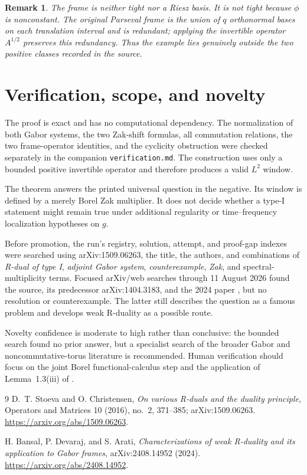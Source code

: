 \documentclass[11pt]{article}
\newtheorem{remark}{Remark}
\begin{document}
\begin{remark}
The frame is neither tight nor a Riesz basis.  It is not tight because
$\phi$ is nonconstant.  The original Parseval frame is the union of $q$
orthonormal bases on each translation interval and is redundant; applying
the invertible operator $A^{1/2}$ preserves this redundancy.  Thus the
example lies genuinely outside the two positive classes recorded in the
source.
\end{remark}

\section{Verification, scope, and novelty}

The proof is exact and has no computational dependency.  The normalization
of both Gabor systems, the two Zak-shift formulas, all commutation relations,
the two frame-operator identities, and the cyclicity obstruction were checked
separately in the companion \texttt{verification.md}.  The construction uses
only a bounded positive invertible operator and therefore produces a valid
$L^2$ window.

The theorem answers the printed universal question in the negative.  Its
window is defined by a merely Borel Zak multiplier.  It does not decide
whether a type-I statement might remain true under additional regularity or
time--frequency localization hypotheses on $g$.

Before promotion, the run's registry, solution, attempt, and proof-gap indexes
were searched using arXiv:1509.06263, the title, the authors, and combinations
of \emph{R-dual of type I}, \emph{adjoint Gabor system}, \emph{counterexample},
\emph{Zak}, and spectral-multiplicity terms.  Focused arXiv/web searches
through 11 August 2026 found the source, its predecessor arXiv:1404.3183, and
the 2024 paper \cite{BDA}, but no resolution or counterexample.  The latter
still describes the question as a famous problem and develops weak R-duality
as a possible route.

Novelty confidence is moderate to high rather than conclusive: the bounded
search found no prior answer, but a specialist search of the broader Gabor
and noncommutative-torus literature is recommended.  Human verification
should focus on the joint Borel functional-calculus step and the application
of Lemma~1.3(iii) of \cite{SC}.

\begin{thebibliography}{9}
D.~T. Stoeva and O. Christensen,
\emph{On various R-duals and the duality principle},
Operators and Matrices 10 (2016), no.~2, 371--385;
arXiv:1509.06263.
\url{https://arxiv.org/abs/1509.06263}.

H. Bansal, P. Devaraj, and S. Arati,
\emph{Characterizations of weak R-duality and its application to Gabor frames},
arXiv:2408.14952 (2024).
\url{https://arxiv.org/abs/2408.14952}.
\end{thebibliography}
\end{document}
